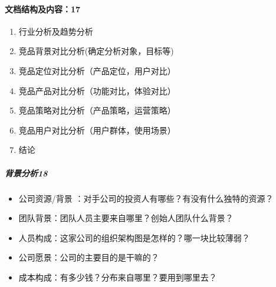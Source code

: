 \documentclass[letterpaper,11pt,english]{sphinxmanual}
\begin{document}
\paragraph{文档结构及内容：17\sphinxfootnotemark[447]}
\label{\detokenize{chapter_knowledge/goods_analysis:id4}}%
\begin{footnotetext}[447]\sphinxAtStartFootnote
{}
%
\end{footnotetext}\ignorespaces \begin{enumerate}
%
\item {} 
行业分析及趋势分析

\item {} 
竞品背景对比分析(确定分析对象，目标等)

\item {} 
竞品定位对比分析（产品定位，用户对比）

\item {} 
竞品产品对比分析（功能对比，体验对比）

\item {} 
竞品策略对比分析（产品策略，运营策略）

\item {} 
竞品用户对比分析（用户群体，使用场景）

\item {} 
结论

\end{enumerate}


\subparagraph{背景分析18\sphinxfootnotemark[448]}
\label{\detokenize{chapter_knowledge/goods_analysis:id5}}%
\begin{footnotetext}[448]\sphinxAtStartFootnote
{}
%
\end{footnotetext}\ignorespaces \begin{itemize}
\item {} 
公司资源/背景 ：对手公司的投资人有哪些？有没有什么独特的资源？

\item {} 
团队背景：团队人员主要来自哪里？创始人团队什么背景？

\item {} 
人员构成：这家公司的组织架构图是怎样的？哪一块比较薄弱？

\item {} 
公司愿景：公司的主要目的是干嘛的？

\item {} 
成本构成：有多少钱？分布来自哪里？要用到哪里去？

\end{itemize}
\end{document}
